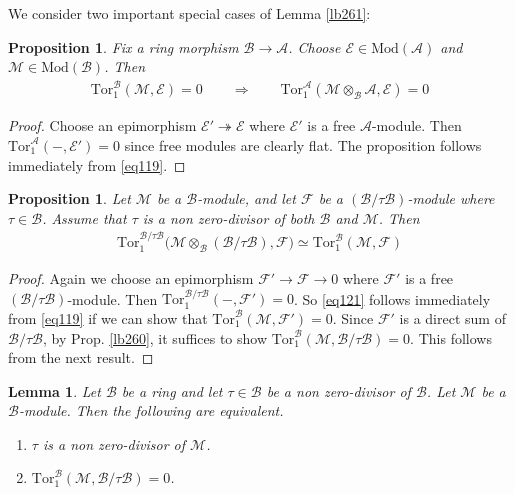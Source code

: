 \documentclass[12pt,b5paper,notitlepage]{report}
\theoremstyle{definition}
\theoremstyle{plain}
\newtheorem{pp}[df]{Proposition}
\newtheorem{lm}[df]{Lemma}
\newcommand{\mc}{\mathcal}
\newcommand{\Tor}{\mathrm{Tor}}
\newcommand{\Mod}{\mathrm{Mod}}
\numberwithin{equation}{section}
\begin{document}
We consider two important special cases of Lemma \ref{lb261}:

\begin{pp}\label{lb272}
Fix a ring morphism $\mc B\rightarrow\mc A$. Choose $\mc E\in\Mod(\mc A)$ and $\mc M\in\Mod(\mc B)$. Then
\begin{align}
\Tor_1^{\mc B}(\mc M,\mc E)=0\qquad\Longrightarrow\qquad \Tor_1^{\mc A}(\mc M\otimes_{\mc B}\mc A,\mc E)=0
\end{align}
\end{pp}

\begin{proof}
Choose an epimorphism $\mc E'\twoheadrightarrow\mc E$ where $\mc E'$ is a free $\mc A$-module. Then $\Tor_1^{\mc A}(-,\mc E')=0$ since free modules are clearly flat. The proposition follows immediately from \eqref{eq119}.
\end{proof}



\begin{pp}\label{lb263}
Let $\mc M$ be a $\mc B$-module, and let $\mc F$ be a $(\mc B/\tau\mc B)$-module where $\tau\in\mc B$. Assume that $\tau$ is a non zero-divisor of both $\mc B$ and $\mc M$. Then
\begin{align}  \label{eq121}
\Tor_1^{\mc B/\tau\mc B}\big(\mc M\otimes_{\mc B}(\mc B/\tau\mc B),\mc F \big)\simeq\Tor_1^{\mc B}(\mc M,\mc F)
\end{align}
\end{pp}



\begin{proof}
Again we choose an epimorphism $\mc F'\rightarrow\mc F\rightarrow0$ where $\mc F'$ is a free $(\mc B/\tau\mc B)$-module. Then $\Tor_1^{\mc B/\tau\mc B}(-,\mc F')=0$. So \eqref{eq121} follows immediately from \eqref{eq119} if we can show that $\Tor_1^{\mc B}(\mc M,\mc F')=0$. Since $\mc F'$ is a direct sum of $\mc B/\tau\mc B$, by Prop. \ref{lb260}, it suffices to show $\Tor_1^{\mc B}(\mc M,\mc B/\tau\mc B)=0$. This follows from the next result.
\end{proof}

\begin{lm}\label{lb273}
Let $\mc B$ be a ring and let $\tau\in\mc B$ be a non zero-divisor of $\mc B$. Let $\mc M$ be a $\mc B$-module. Then the following are equivalent.
\begin{enumerate}[label=(\arabic*)]
\item $\tau$ is a non zero-divisor of $\mc M$.
\item $\Tor_1^{\mc B}(\mc M,\mc B/\tau\mc B)=0$.
\end{enumerate}
\end{lm}
\end{document}
